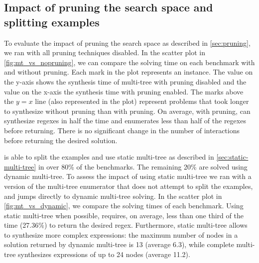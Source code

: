 

\subsection{Impact of pruning the search space and splitting examples}\label{sec:pruning-split}
%


To evaluate the impact of pruning the search space as described in \autoref{sec:pruning}, we ran \Forest{} with all pruning techniques disabled.
In the scatter plot in \autoref{fig:mt_vs_nopruning}, we can compare the solving time on each benchmark with and without pruning. Each mark in the plot represents an instance. The value on the y-axis shows the synthesis time of multi-tree with pruning disabled and the value on the x-axis the synthesis time with pruning enabled. The marks above the \(y = x\) line (also represented in the plot) represent problems that took longer to synthesize without pruning than with pruning.
On average, with pruning, \Forest{} can synthesize regexes in half the time and enumerates less than half of the regexes before returning. There is no significant change in the number of interactions before returning the desired solution.


\Forest{} is able to split the examples and use static multi-tree as described in \autoref{sec:static-multi-tree} in over 80\% of the benchmarks. The remaining 20\% are solved using dynamic multi-tree. To assess the impact of using static multi-tree we ran \Forest{} with a version of the multi-tree enumerator that does not attempt to split the examples, and jumps directly to dynamic multi-tree solving.
In the scatter plot in \autoref{fig:mt_vs_dynamic}, we compare the solving times of each benchmark. Using static multi-tree when possible, \Forest{} requires, on average, less than one third of the time (27.36\%) to return the desired regex. Furthermore, static multi-tree allows \Forest{} to synthesize more complex expressions: the maximum number of nodes in a solution returned by dynamic multi-tree is 13 (average 6.3), while complete multi-tree synthesizes expressions of up to 24 nodes (average 11.2).

